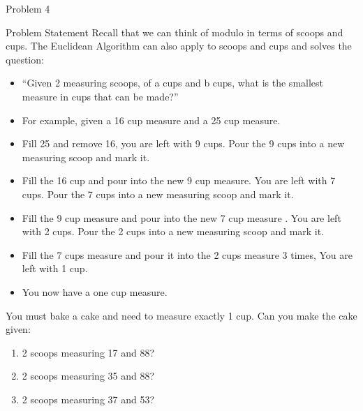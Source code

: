 \begin{problem}{Problem 4}
    \begin{statement}{Problem Statement}
        Recall that we can think of modulo in terms of scoops and cups. The Euclidean Algorithm can also apply to scoops and cups and solves the question:

        \begin{itemize}
            \item “Given 2 measuring scoops, of a cups and b cups, what is the smallest measure in cups that can be made?”
            \item For example, given a 16 cup measure and a 25 cup measure.
            \item Fill 25 and remove 16, you are left with 9 cups. Pour the 9 cups into a new measuring scoop and mark it.
            \item Fill the 16 cup and pour into the new 9 cup measure. You are left with 7 cups. Pour the 7 cups into a new measuring scoop and mark it.
            \item Fill the 9 cup measure and pour into the new 7 cup measure . You are left with 2 cups. Pour the 2 cups into a new measuring scoop and mark it.
            \item Fill the 7 cups measure and pour it into the 2 cups measure 3 times, You are left with 1 cup.
            \item You now have a one cup measure.
        \end{itemize}


        You must bake a cake and need to measure exactly 1 cup. Can you make the cake given:

        \begin{enumerate}[label = (\alph*)]
            \item 2 scoops measuring 17 and 88?
            \item 2 scoops measuring 35 and 88?
            \item 2 scoops measuring 37 and 53?
        \end{enumerate}
    \end{statement}


\end{problem}
